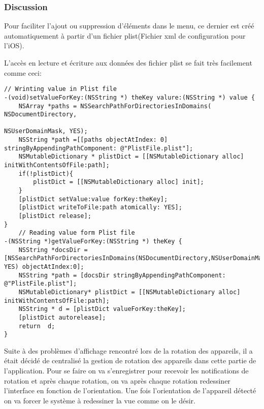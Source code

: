 		\subsubsection*{Discussion}
		Pour faciliter l'ajout ou suppression d'éléments dans le menu, ce dernier est créé automatiquement à partir  d'un fichier plist(Fichier xml de configuration pour l'iOS). 
			
		L'accès en lecture et écriture aux données des fichier plist se fait très facilement comme ceci:
	\lstset{
	    style = Xcode,
	    caption=Code d'ecriture et de lecture dans un fichier plist.,
	    breaklines=true,
	    frame=single
	}
	
	\begin{lstlisting}[name=R/W in plist, label=SampleCode]
	// Wrinting value in Plist file
-(void)setValueForKey:(NSString *) theKey valure:(NSString *) value {
    NSArray *paths = NSSearchPathForDirectoriesInDomains( NSDocumentDirectory,
                                                         NSUserDomainMask, YES); 
    NSString *path =[[paths objectAtIndex: 0] stringByAppendingPathComponent: @"PlistFile.plist"];
    NSMutableDictionary * plistDict = [[NSMutableDictionary alloc] initWithContentsOfFile:path];
    if(!plistDict){
        plistDict = [[NSMutableDictionary alloc] init];
    }
    [plistDict setValue:value forKey:theKey];
    [plistDict writeToFile:path atomically: YES];
    [plistDict release];
}
	// Reading value form Plist file
-(NSString *)getValueForKey:(NSString *) theKey {
    NSString *docsDir = [NSSearchPathForDirectoriesInDomains(NSDocumentDirectory,NSUserDomainMask, YES) objectAtIndex:0];
    NSString *path = [docsDir stringByAppendingPathComponent: @"PlistFile.plist"];
    NSMutableDictionary* plistDict = [[NSMutableDictionary alloc] initWithContentsOfFile:path];
    NSString * d = [plistDict valueForKey:theKey];
    [plistDict autorelease];
    return  d;
}
\end{lstlisting}


		Suite à des problèmes d'affichage rencontré lors de la rotation des appareils, il a était décidé de centralisé la gestion de rotation des appareils dans cette partie de l'application. Pour se faire on va s'enregistrer pour recevoir les notifications de rotation et après chaque rotation, on va après chaque rotation redessiner l'interface en fonction de l'orientation. Une fois l'orientation de l'appareil détecté on va forcer le système à redessiner la vue comme on le désir. 
		
